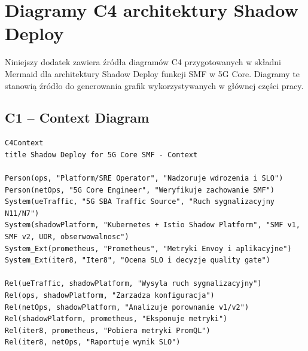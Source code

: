 \chapter{Diagramy C4 architektury Shadow Deploy}
\label{chap:c4-mermaid}

Niniejszy dodatek zawiera źródła diagramów C4 przygotowanych w składni Mermaid dla architektury Shadow Deploy funkcji SMF w 5G Core. Diagramy te stanowią źródło do generowania grafik wykorzystywanych w głównej części pracy.

\section{C1 -- Context Diagram}
\begin{lstlisting}[basicstyle=\footnotesize\ttfamily,caption=C1 Context Diagram w Mermaid,label=lst:c1-mermaid]
C4Context
title Shadow Deploy for 5G Core SMF - Context

Person(ops, "Platform/SRE Operator", "Nadzoruje wdrozenia i SLO")
Person(netOps, "5G Core Engineer", "Weryfikuje zachowanie SMF")
System(ueTraffic, "5G SBA Traffic Source", "Ruch sygnalizacyjny N11/N7")
System(shadowPlatform, "Kubernetes + Istio Shadow Platform", "SMF v1, SMF v2, UDR, obserwowalnosc")
System_Ext(prometheus, "Prometheus", "Metryki Envoy i aplikacyjne")
System_Ext(iter8, "Iter8", "Ocena SLO i decyzje quality gate")

Rel(ueTraffic, shadowPlatform, "Wysyla ruch sygnalizacyjny")
Rel(ops, shadowPlatform, "Zarzadza konfiguracja")
Rel(netOps, shadowPlatform, "Analizuje porownanie v1/v2")
Rel(shadowPlatform, prometheus, "Eksponuje metryki")
Rel(iter8, prometheus, "Pobiera metryki PromQL")
Rel(iter8, netOps, "Raportuje wynik SLO")
\end{lstlisting}

